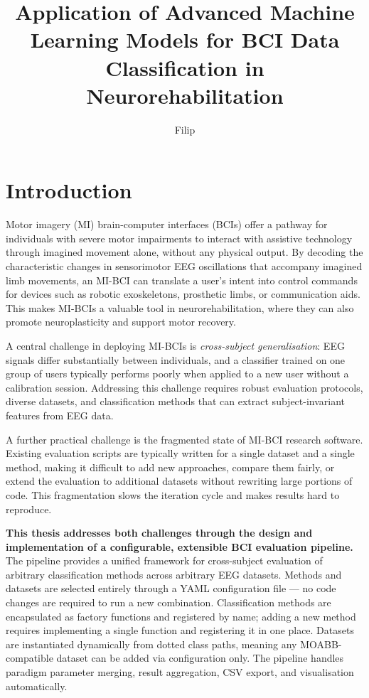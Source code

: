 \documentclass[english, bc, kiv, he, iso690alph, pdf]{fasthesis}
\title{Application of Advanced Machine Learning Models for BCI Data Classification in Neurorehabilitation}
\author{Filip}{Chlad}{}{}
\begin{document}
\frontpages[notm]

\tableofcontents

\chapter{Introduction}

Motor imagery (MI) brain-computer interfaces (BCIs) offer a pathway for individuals with severe motor impairments to interact with assistive technology through imagined movement alone, without any physical output. By decoding the characteristic changes in sensorimotor EEG oscillations that accompany imagined limb movements, an MI-BCI can translate a user's intent into control commands for devices such as robotic exoskeletons, prosthetic limbs, or communication aids. This makes MI-BCIs a valuable tool in neurorehabilitation, where they can also promote neuroplasticity and support motor recovery.

A central challenge in deploying MI-BCIs is \textit{cross-subject generalisation}: EEG signals differ substantially between individuals, and a classifier trained on one group of users typically performs poorly when applied to a new user without a calibration session. Addressing this challenge requires robust evaluation protocols, diverse datasets, and classification methods that can extract subject-invariant features from EEG data.

A further practical challenge is the fragmented state of MI-BCI research software. Existing evaluation scripts are typically written for a single dataset and a single method, making it difficult to add new approaches, compare them fairly, or extend the evaluation to additional datasets without rewriting large portions of code. This fragmentation slows the iteration cycle and makes results hard to reproduce.

\textbf{This thesis addresses both challenges through the design and implementation of a configurable, extensible BCI evaluation pipeline.} The pipeline provides a unified framework for cross-subject evaluation of arbitrary classification methods across arbitrary EEG datasets. Methods and datasets are selected entirely through a YAML configuration file — no code changes are required to run a new combination. Classification methods are encapsulated as factory functions and registered by name; adding a new method requires implementing a single function and registering it in one place. Datasets are instantiated dynamically from dotted class paths, meaning any MOABB-compatible dataset can be added via configuration only. The pipeline handles paradigm parameter merging, result aggregation, CSV export, and visualisation automatically.
\end{document}
